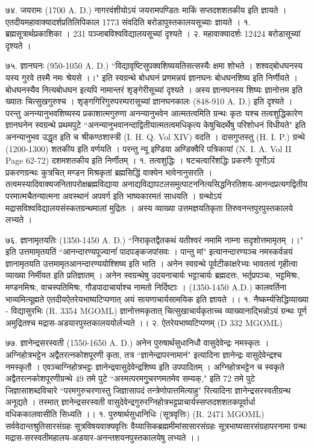 ७४. जयरामः (1700 A. D.)
नागरवंशीयोऽयं जयरामपण्डितः माकिं सप्तदशशतकीय इति ज्ञायते । एतदीयमहावाक्यादर्शप्रतिलिपिकाल 1773 संवदिति बरोडापुस्तकालयसूच्याः ज्ञायते ।
१. ब्रह्मसूत्रार्थप्रकाशिका । 231 पञ्जाबविश्वविद्यालयसूच्यां दृश्यते ।
२. महावाक्यादर्शः 12424 बरोडासूच्यां दृश्यते ।

७५. ज्ञानघनः (950-1050 A. D.)
``विद्यावृष्टिसुपक्वशिष्ययतिसत्सस्यैः क्षमा शोभते ।
शश्वद्बोधघनस्य यस्य गुरवे तस्मै नमः श्रेयसे ।।"
इति स्वग्रन्थे बोधघनं प्रणमन्नयं ज्ञानघनः बोधघनशिष्य इति निर्णीयते । बोधघनस्यैव नित्यबोधघन इत्यपि नामान्तरं शृङ्गेरीसूच्यां दृश्यते । अस्य ज्ञानघनस्य शिष्यः ज्ञानोत्तम इति ख्यातः चित्सुखगुरुश्च । शृङ्गगिरिगुरुपरम्परासूच्यां ज्ञानघनकालः (848-910 A. D.) इति दृश्यते । परन्तु अनन्यानुभवशिष्यस्य प्रकाशात्मगुरुणा अनन्यानुभवेन आत्मतत्वमिति ग्रन्थः कृतः यश्च तत्वशुद्धिकारेण ज्ञानघनेन स्वग्रन्थे प्रथमपुटे ``अनन्यानुभवानन्दाद्वितीयात्मतत्वमधिकृत्य केषुचिदर्थेषु परिशोधनं विधीयते" इति अनन्यानुभव उद्धृत इति च श्रीकण्ठशास्त्री (I. H. Q. Vol XIV) वदति । दासगुप्तस्तु (H. I. P.) ग्रन्थे (1200-1300) शतकीय इति वर्णयति । परन्तु न्यू इण्डिया अण्डिक्वैरि पत्रिकायां (N. I. A. Vol II Page 62-72) दशमशतकीय इति निर्णीतम् ।
१. तत्वशुद्धिः । षटचत्वारिंशद्धिः प्रकरणैः पूर्णोऽयं प्रकरणग्रन्थः कुत्रचित् मण्डन मिश्रकृतां ब्रह्मसिद्धिं वाक्येन भावेनानुसरति । तत्वमस्यादिवाक्यजनितापरोक्षब्रह्मविद्याया अनाद्यविद्यापटलसमुत्पाटननित्यसिद्धनिरतिशय-आनन्दप्रत्यगद्वितीय परमात्मचैतन्यात्मना अवस्थानं अपवर्ग इति भाष्यकारमतं साधयति । ग्रन्थोऽयं मद्रासविश्वविद्यालयसंस्कतग्रन्थमालां मुद्रितः । अस्य व्याख्या उत्तमज्ञयतिकृता तिरुवनन्तपुरपुस्तकालये लभ्यते ।

७६. ज्ञानामृतयतिः (1350-1450 A. D.)
``निराकृतद्वैतकथं यतीश्वरं नमामि नाम्ना सदृशोत्तमामृतम् ।।" इति उत्तमामृतयतिं ``आनन्दारण्यपूज्यानांं पादपङ्कजपांसवः । पान्तु मां" इत्यानन्दारण्यञ्च नमस्कर्वन्नयं ज्ञानामृतयति उत्तमामृतआनन्दारण्ययोश्शिष्य इति भाति ।
अनेन स्वग्रन्थे पूर्वटीकाक्षरेभ्यः भावतत्वं गृहीत्वा व्याख्या निर्मीयत इति प्रतिज्ञातम् । अनेन स्वग्रन्थेषु उदयनाचार्यः भट्टाचार्यः ब्रह्मदत्तः, भर्तृप्रपञ्चः, भट्टमिश्रः, मण्डनमिश्रः, वाचस्पतिमिश्रः, गौडपादाचार्याश्च नामतो निर्दिष्टाः । (1350-1450 A.D.) कालवर्तिना भाव्यमित्यूह्मते एतदीयऐतरेयभाष्यटिप्पणात् अयं सायणाचार्यसामयिक इति ज्ञायते ।।
१. नैष्कर्म्यसिद्धिव्याख्या - विद्यासुरभिः (R. 3354 MGOML)
ज्ञानोत्तमकृतात् चित्सुखाचार्यकृताच्च व्याख्यानाद्भिन्नोऽयं ग्रन्थः पूर्ण अमुद्रितश्च मद्रास-अडयारपुस्तकालययोर्लभ्यते ।।
२. ऐतरेयभाष्यटिप्पणम् (D 332 MGOML)

७७. ज्ञानेन्द्रसरस्वती (1550-1650 A. D.)
अनेन पुरुषार्थसुधानिधौ वासुदेवेन्द्रः नमस्कृतः । अग्निहोत्रभट्टेन अद्वैतरत्नकोशपूरणी कृता, तत्र ``ज्ञानेन्द्रापरनामानं" इत्यादिना ज्ञानेन्द्रः वासुदेवेन्द्रश्च नमस्कृतौ । एवञ्चाग्निहोत्रभट्टः ज्ञानेन्द्रवासुदेवेन्द्रशिष्य इति उपपादितम् । अग्निहोत्रभट्टेन च स्वकृते अद्वैतरत्नकोशपूरणीग्रन्थे 49 तमे पुटे ``अस्मत्परमगुुचरणमतमेव सम्यक्," इति 72 तमे पुटे जिज्ञासाशब्दविचारे ``परमगुरुचरणास्तु जिज्ञासापदं तन्त्रेणोपात्तमित्याहु" रित्यादिना ज्ञानेन्द्रसरस्वतीग्रन्थ अनूद्यते । तस्मात् ज्ञानेन्द्रसरस्वती वासुदेवेन्द्रगुरुरग्निहोत्रभट्टप्राचार्यस्सप्तदशशतकपूर्वार्धा वधिककालवासीति सिध्यति ।।
१. पुरुषार्थसुधानिधिः (सूत्रवृत्तिः) (R. 2471 MGOML)
सर्ववेदान्तश्रुतिसारसंग्रहः सूत्रविषयवाक्यवृत्तिः वैय्यासिकब्रह्ममीमांसासारसंग्रहः सूत्रभाष्यसारसंग्रहापरनामा ग्रन्थः मद्रास-सरस्वतीमहालय-अडयार-अनन्तशयनपुस्तकालयेषु लभ्यते ।।

